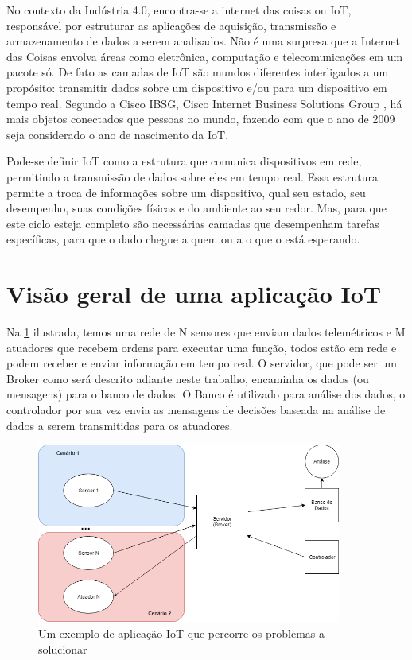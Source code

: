 No contexto da Indústria 4.0, encontra-se a internet das coisas ou IoT, responsável por estruturar as aplicações de aquisição, transmissão e armazenamento de dados a serem analisados. Não é uma surpresa que a Internet das Coisas envolva áreas como eletrônica, computação e telecomunicações em um pacote só. De fato as camadas de IoT são mundos diferentes interligados a um propósito: transmitir dados sobre um dispositivo e/ou para um dispositivo em tempo real. Segundo a Cisco IBSG, Cisco Internet Business Solutions Group \cite{cisco:ibsg}, há mais objetos conectados que pessoas no mundo, fazendo com que o ano de 2009 seja considerado o ano de nascimento da IoT.

Pode-se definir IoT como a estrutura que comunica dispositivos em rede, permitindo a transmissão de dados sobre eles em tempo real. Essa estrutura permite a troca de informações sobre um dispositivo, qual seu estado, seu desempenho, suas condições físicas e do ambiente ao seu redor. Mas, para que este ciclo esteja completo são necessárias camadas que desempenham tarefas específicas, para que o dado chegue a quem ou a o que o está esperando.

\section{Visão geral de uma aplicação IoT}
\label{section:overview}

Na \ref{fig:1.1.0/iot_app} ilustrada, temos uma rede de N sensores que enviam dados telemétricos e M atuadores que recebem ordens para executar uma função, todos estão em rede e podem receber e enviar informação em tempo real. O servidor, que pode ser um Broker como será descrito adiante neste trabalho, encaminha os dados (ou mensagens) para o banco de dados. O Banco é utilizado para análise dos dados, o controlador por sua vez envia as mensagens de decisões baseada na análise de dados a serem transmitidas para os atuadores.

\begin{figure}[h!]
\centering
\includegraphics[width=10cm]{./02_Capitulos/02_Cap1/figures/iot_app}
\caption{Um exemplo de aplicação IoT que percorre os problemas a solucionar}
\label{fig:1.1.0/iot_app}
\end{figure}

